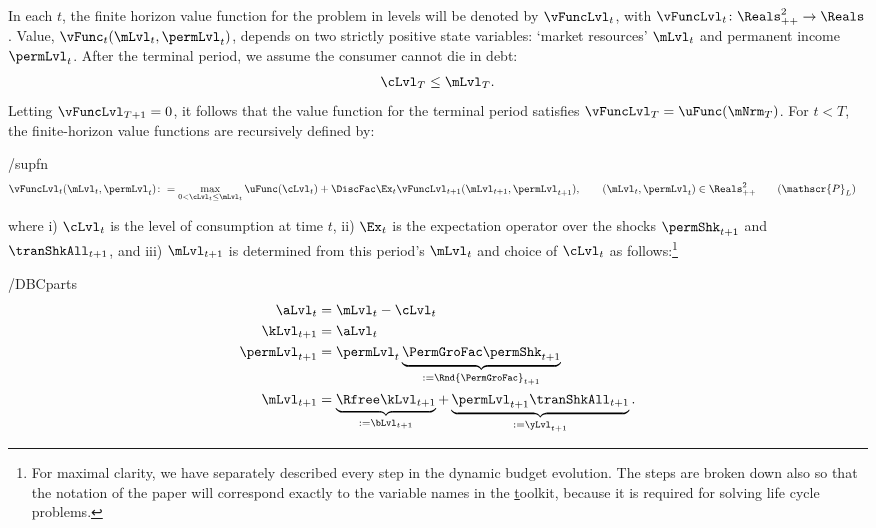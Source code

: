 \documentclass[BufferStockTheory]{subfiles}
\begin{document}
In each $t$, the finite horizon value function for the problem in levels will be denoted by $\vFuncLvl_{t}$, with $\vFuncLvl_{t}\colon \Reals_{++}^{2}\rightarrow \Reals$. Value, $\vFunc_{t}(\mLvl_{t}, \permLvl_{t})$, depends on two strictly positive state variables: `market resources' $\mLvl_{t}$ and permanent income $\permLvl_{t}$.
After the terminal period, we assume the consumer cannot die in debt:
%
\begin{equation}\label{eq:NoDebtAtDeath}
\cLvl_{T} \leq  \mLvl_{T} .
\end{equation}
%
Letting $\vFuncLvl_{T+1} = 0$, it follows that the value function for the terminal period satisfies $\vFuncLvl_{T} = \uFunc(\mNrm_{T})$.
For $t<T$, the finite-horizon value functions are recursively defined by:

%
\begin{verbatimwrite}{\EqDir/supfn}
  \begin{align}\label{eq:levelRecProblem}
    \vFuncLvl_{t}(\mLvl_{t}, \permLvl_{t})\colon & = \max_{0 < \cLvl_{t} \leq \mLvl_{t}} \uFunc(\cLvl_{t}) + \DiscFac \Ex_{t}\vFuncLvl_{t+1}(\mLvl_{t+1}, \permLvl_{t+1}), \qquad (\mLvl_{t}, \permLvl_{t})\in \Reals_{++}^{2} \tag{$\mathscr{P}_{L}$}
  \end{align}
\end{verbatimwrite} \unskip
 
\noindent where i) $\cLvl_{t}$ is the level of consumption at time $t$, ii) $\Ex_{t}$ is the expectation operator over the shocks $\permShk_{t+1}$ and $\tranShkAll_{t+1}$\hypertarget{checkRestrictions}{}\hypertarget{DBCparts}{}, and iii) $\mLvl_{t+1}$ is determined from this period's $\mLvl_{t}$ and choice of $\cLvl_{t}$ as follows:\footnote{For maximal clarity, we have separately described every step in the dynamic budget evolution.
The steps are broken down also so that the notation of the paper will correspond exactly to the variable names in the \href{https://github.com/econ-ark/HARK} toolkit, because it is required for solving life cycle problems.}%
%
\begin{verbatimwrite}{\EqDir/DBCparts}
  \begin{equation}\label{eq:DBCparts} %
    \begin{split}
      \aLvl_{t}     & = \mLvl_{t}-\cLvl_{t}  \\
      \kLvl_{t+1}   & = \aLvl_{t} \notag \\
      \permLvl_{t+1}  & = \permLvl_{t} \underbrace{\PermGroFac\permShk_{t+1}}_{:= \Rnd{\PermGroFac}_{t+1}} \notag \\
      \mLvl_{t+1}  & =   \underbrace{\Rfree \kLvl_{t+1}}_{:= \bLvl_{t+1}}  +\underbrace{\permLvl_{t+1}\tranShkAll_{t+1}}_{:= \yLvl_{t+1}}. \notag
    \end{split}
  \end{equation}
\end{verbatimwrite}\unskip
\end{document}
